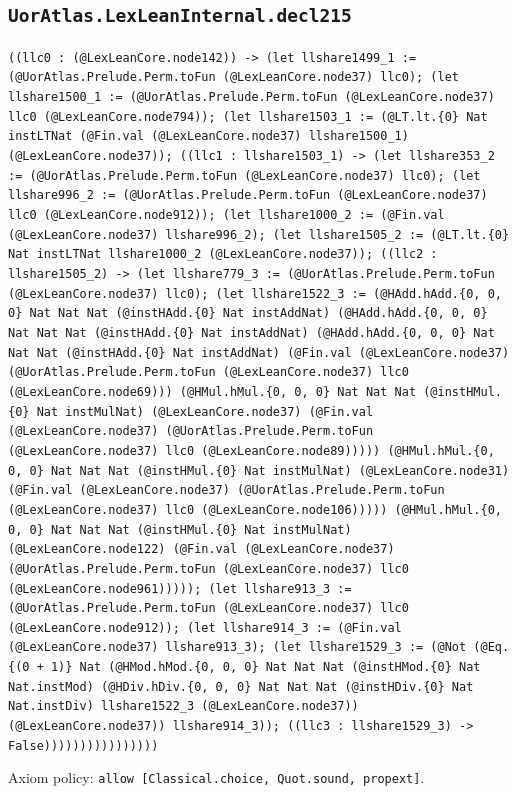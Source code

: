 \documentclass[11pt]{article}
\begin{document}
\subsection*{\texttt{UorAtlas.LexLeanInternal.decl215}}
\noindent\texttt{((llc0 : (@LexLeanCore.node142)) -> (let llshare1499\_1 := (@UorAtlas.Prelude.Perm.toFun (@LexLeanCore.node37) llc0); (let llshare1500\_1 := (@UorAtlas.Prelude.Perm.toFun (@LexLeanCore.node37) llc0 (@LexLeanCore.node794)); (let llshare1503\_1 := (@LT.lt.\{0\} Nat instLTNat (@Fin.val (@LexLeanCore.node37) llshare1500\_1) (@LexLeanCore.node37)); ((llc1 : llshare1503\_1) -> (let llshare353\_2 := (@UorAtlas.Prelude.Perm.toFun (@LexLeanCore.node37) llc0); (let llshare996\_2 := (@UorAtlas.Prelude.Perm.toFun (@LexLeanCore.node37) llc0 (@LexLeanCore.node912)); (let llshare1000\_2 := (@Fin.val (@LexLeanCore.node37) llshare996\_2); (let llshare1505\_2 := (@LT.lt.\{0\} Nat instLTNat llshare1000\_2 (@LexLeanCore.node37)); ((llc2 : llshare1505\_2) -> (let llshare779\_3 := (@UorAtlas.Prelude.Perm.toFun (@LexLeanCore.node37) llc0); (let llshare1522\_3 := (@HAdd.hAdd.\{0, 0, 0\} Nat Nat Nat (@instHAdd.\{0\} Nat instAddNat) (@HAdd.hAdd.\{0, 0, 0\} Nat Nat Nat (@instHAdd.\{0\} Nat instAddNat) (@HAdd.hAdd.\{0, 0, 0\} Nat Nat Nat (@instHAdd.\{0\} Nat instAddNat) (@Fin.val (@LexLeanCore.node37) (@UorAtlas.Prelude.Perm.toFun (@LexLeanCore.node37) llc0 (@LexLeanCore.node69))) (@HMul.hMul.\{0, 0, 0\} Nat Nat Nat (@instHMul.\{0\} Nat instMulNat) (@LexLeanCore.node37) (@Fin.val (@LexLeanCore.node37) (@UorAtlas.Prelude.Perm.toFun (@LexLeanCore.node37) llc0 (@LexLeanCore.node89))))) (@HMul.hMul.\{0, 0, 0\} Nat Nat Nat (@instHMul.\{0\} Nat instMulNat) (@LexLeanCore.node31) (@Fin.val (@LexLeanCore.node37) (@UorAtlas.Prelude.Perm.toFun (@LexLeanCore.node37) llc0 (@LexLeanCore.node106))))) (@HMul.hMul.\{0, 0, 0\} Nat Nat Nat (@instHMul.\{0\} Nat instMulNat) (@LexLeanCore.node122) (@Fin.val (@LexLeanCore.node37) (@UorAtlas.Prelude.Perm.toFun (@LexLeanCore.node37) llc0 (@LexLeanCore.node961))))); (let llshare913\_3 := (@UorAtlas.Prelude.Perm.toFun (@LexLeanCore.node37) llc0 (@LexLeanCore.node912)); (let llshare914\_3 := (@Fin.val (@LexLeanCore.node37) llshare913\_3); (let llshare1529\_3 := (@Not (@Eq.\{(0 + 1)\} Nat (@HMod.hMod.\{0, 0, 0\} Nat Nat Nat (@instHMod.\{0\} Nat Nat.instMod) (@HDiv.hDiv.\{0, 0, 0\} Nat Nat Nat (@instHDiv.\{0\} Nat Nat.instDiv) llshare1522\_3 (@LexLeanCore.node37)) (@LexLeanCore.node37)) llshare914\_3)); ((llc3 : llshare1529\_3) -> False))))))))))))))))}\par
\noindent Axiom policy: \texttt{allow [Classical.choice, Quot.sound, propext]}.\par
\end{document}
